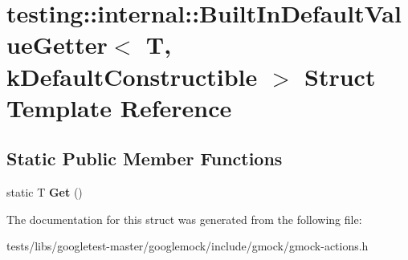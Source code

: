 \hypertarget{structtesting_1_1internal_1_1BuiltInDefaultValueGetter}{}\section{testing\+:\+:internal\+:\+:Built\+In\+Default\+Value\+Getter$<$ T, k\+Default\+Constructible $>$ Struct Template Reference}
\label{structtesting_1_1internal_1_1BuiltInDefaultValueGetter}
\subsection*{Static Public Member Functions}
\begin{DoxyCompactItemize}
\item 
\mbox{\label{structtesting_1_1internal_1_1BuiltInDefaultValueGetter_a61c47c50cdb6ab488dabe2cec3b97fc8}} 
static T {\bfseries Get} ()
\end{DoxyCompactItemize}


The documentation for this struct was generated from the following file\+:\begin{DoxyCompactItemize}
\item 
tests/libs/googletest-\/master/googlemock/include/gmock/gmock-\/actions.\+h\end{DoxyCompactItemize}
